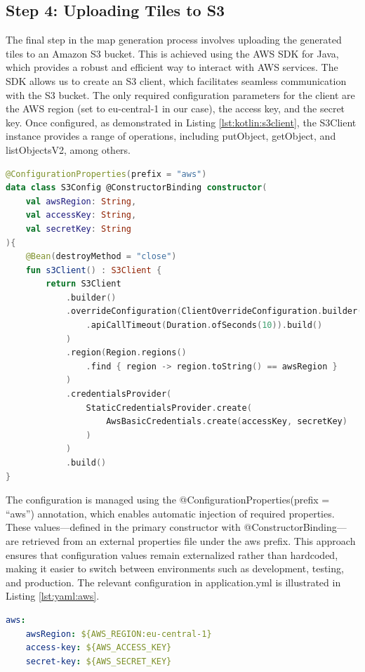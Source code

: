 \subsection{Step 4: Uploading Tiles to S3}

The final step in the map generation process involves uploading the generated tiles to an Amazon S3 bucket. This is achieved using the AWS SDK for Java, which provides a robust and efficient way to interact with AWS services. The SDK allows us to create an S3 client, which facilitates seamless communication with the S3 bucket. The only required configuration parameters for the client are the AWS region (set to eu-central-1 in our case), the access key, and the secret key. Once configured, as demonstrated in Listing \ref{lst:kotlin:s3client}, the S3Client instance provides a range of operations, including putObject, getObject, and listObjectsV2, among others.

\begin{lstlisting}[language=Kotlin,caption=Configuring the S3 Client,label=lst:kotlin:s3client]
@ConfigurationProperties(prefix = "aws")
data class S3Config @ConstructorBinding constructor(
    val awsRegion: String,
    val accessKey: String,
    val secretKey: String
){
    @Bean(destroyMethod = "close")
    fun s3Client() : S3Client {
        return S3Client
            .builder()
            .overrideConfiguration(ClientOverrideConfiguration.builder()
                .apiCallTimeout(Duration.ofSeconds(10)).build()
            )
            .region(Region.regions()
                .find { region -> region.toString() == awsRegion }
            )
            .credentialsProvider(
                StaticCredentialsProvider.create(
                    AwsBasicCredentials.create(accessKey, secretKey)
                )
            )
            .build()
}
\end{lstlisting}

The configuration is managed using the @ConfigurationProperties(prefix = ``aws'') annotation, which enables automatic injection of required properties. These values—defined in the primary constructor with @ConstructorBinding—are retrieved from an external properties file under the aws prefix. This approach ensures that configuration values remain externalized rather than hardcoded, making it easier to switch between environments such as development, testing, and production. The relevant configuration in application.yml is illustrated in Listing \ref{lst:yaml:aws}.
\begin{lstlisting}[language=Yaml, caption=AWS Configuration in application.yml, label=lst:yaml:aws]
aws:
    awsRegion: ${AWS_REGION:eu-central-1}
    access-key: ${AWS_ACCESS_KEY}
    secret-key: ${AWS_SECRET_KEY}
\end{lstlisting}

